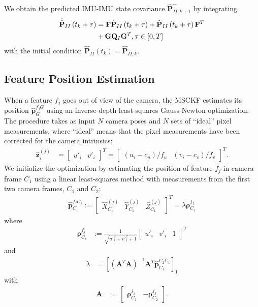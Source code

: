 \documentclass[letterpaper, 10 pt, conference]{ieeeconf}  %
\def\Vec#1{\mathbf{#1}}
\newcommand{\bbm}{\begin{bmatrix}}
\newcommand{\ebm}{\end{bmatrix}}
\begin{document}
We obtain the predicted IMU-IMU state covariance $\hat{\Vec{P}}^-_{II,k+1}$ by integrating
\begin{align} \label{eq:imucovar}
    \dot{\hat{\Vec{P}}}_{II}\left(t_k  + \tau \right) &= \Vec{F} \hat{\Vec{P}}_{II}\left(t_k  + \tau \right) 
                 + \hat{\Vec{P}}_{II}\left(t_k  + \tau \right) \Vec{F}^T \notag \\ 
                & + \Vec{G} \Vec{Q}_I \Vec{G}^T, \tau\in\left[0,T\right]
\end{align}
with the initial condition $\hat{\Vec{P}}_{II}\left(t_k\right) = \hat{\Vec{P}}_{II,k}$. 

\subsection{Feature Position Estimation}
When a feature $f_j$ goes out of view of the camera, the MSCKF estimates its position $\hat{\Vec{p}}_G^{f_j G}$ using an inverse-depth least-squares Gauss-Newton optimization. 
The procedure takes as input $N$ camera poses and $N$ sets of ``ideal'' pixel measurements, where ``ideal'' means that the pixel measurements have been corrected for the camera intrinsics:
\begin{align}
\hat{\Vec{z}}_i^{(j)} &= \bbm u'_i & v'_i \ebm ^T = \bbm (u_i - c_u)/f_u & (v_i - c_v)/f_v \ebm ^T.
\end{align}
We initialize the optimization by estimating the position of feature $f_j$ in camera frame $C_1$ using a linear least-squares method with measurements from the first two camera frames, $C_1$ and $C_2$:
\begin{align}
\hat{\Vec{p}}_{C_1}^{f_j C_1} := \bbm \hat{X}^{(j)}_{C_1} & \hat{Y}^{(j)}_{C_1} & \hat{Z}^{(j)}_{C_1} \ebm ^T = \lambda \boldsymbol{\rho}_{C_1}^{f_j}
\end{align}
where
\begin{align}
\boldsymbol{\rho}_{C_i}^{f_j} &:= \frac{1}{\sqrt{u'^2_i + v'^2_i + 1}}\bbm u'_i & v'_i & 1\ebm^T
\end{align}
and
\begin{align}
\lambda &= \left[(\Vec A^T \Vec A)^{-1} \Vec A^T \hat{\Vec{p}}_{C_1}^{C_2 C_1} \right]_1
\end{align}
with
\begin{align}
\Vec A &:= \bbm \boldsymbol{\rho}_{C_1}^{f_j} & -\boldsymbol{\rho}_{C_2}^{f_j} \ebm.
\end{align}
\end{document}
